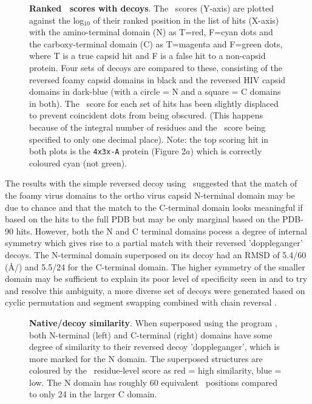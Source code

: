 \begin{figure}
\centering
{}
\begin{footnotesize}
\caption{
\label{Fig:revs}
{\bf Ranked \DALI\ scores with decoys}.
The \DALI\ scores (Y-axis) are plotted against the log$_{10}$ of their ranked position in the 
list of hits (X-axis) with the amino-terminal domain (N) as T=red, F=cyan dots and the carboxy-terminal domain (C)
as T=magenta and F=green dots, where T is a true capsid hit and F is a false hit to a non-capsid protein.
Four sets of decoys are compared to these, consisting of the reversed foamy capsid domains in
black and the reversed HIV capsid domains in dark-blue (with a circle = N and a square = C domains in both).
The \DALI\ score for each set of hits has been slightly displaced to prevent coincident dots from being
obscured.  (This happens because of the integral number of residues and the \DALI\ score being specified
to only one decimal place).
Note: the top scoring hit in both plots is the {\tt 4x3x-A} protein (Figure 2$a$) which is correctly coloured cyan (not green).
}
\end{footnotesize}
\end{figure}

The results with the simple reversed decoy using \DALI\, suggested that the match of the foamy virus domains to the
ortho virus capsid N-terminal domain may be due to chance and that the match to the C-terminal domain looks 
meaningful if based on the hits to the full PDB but may be only marginal based on the PDB-90 hits. 
However, both the N and C terminal domains pocess a degree of internal symmetry which gives
rise to a partial match with their reversed 'doppleganger' decoys.   The N-terminal domain superposed on its decoy
had an RMSD of 5.4/60 (\AA/\CA) and 5.5/24 for the C-terminal domain.   The higher symmetry of the smaller
domain may be sufficient to explain its poor level of specificity seen in  and to try and resolve this
ambiguity, a more diverse set of decoys were generated based on cyclic permutation and segment swapping combined
with chain reversal \cite{TaylorWT97e}.

\begin{figure}
\centering
{}
\begin{footnotesize}
\caption{
\label{Fig:tows}
{\bf Native/decoy similarity}.
When superposed using the program \SAP, both N-terminal (left) and C-terminal (right) domains
have some degree of similarity to their reversed decoy 'doppleganger', which is more marked
for the N domain.   The superposed structures are coloured by the \SAP\ residue-level score as
red = high similarity, blue = low.  The N domain has roughly 60 equivalent \CA\ positions
compared to only 24 in the larger C domain.
}
\end{footnotesize}
\end{figure}

